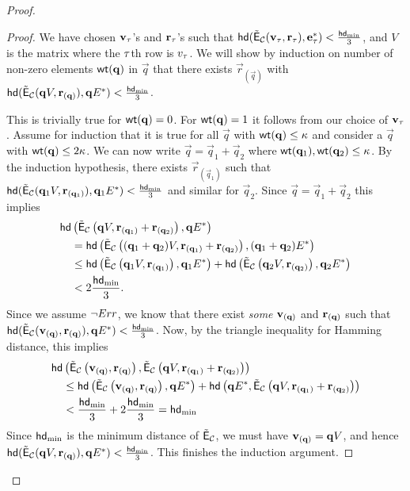 \begin{proof}
\begin{proof}
We have chosen ${\mathbf{v}}_\tau$'s and $\mathbf{r}_\tau$'s such that $\mathsf{hd}(\tilde{\mathsf{E}}_{\mathcal{C}}({\mathbf{v}}_\tau,\mathbf{r}_\tau),\mathbf{e}^*_\tau)<\frac{\mathsf{hd}_{\mathrm{min}}}{3}$, and $V$ is the matrix where the $\tau$th row is $v_\tau$. We will show by induction on number of non-zero elements $\mathsf{wt}(\mathbf{q})$ in $\vec{q}$ that there exists $\vec{r}_{(\vec{q})}$ with $\mathsf{hd}(\tilde{\mathsf{E}}_{\mathcal{C}}(\mathbf{q} V, \mathbf{r}_{(\mathbf{q})}), \mathbf{q} E^*)< \frac{\mathsf{hd}_{\mathrm{min}}}{3}$. 


This is trivially true for $\mathsf{wt}(\mathbf{q})=0$. For $\mathsf{wt}(\mathbf{q})=1$ it follows from our choice of ${\mathbf{v}}_\tau$. Assume for induction that it is true for all $\vec{q}$ with $\mathsf{wt}(\mathbf{q})\leq \kappa$ and consider a $\vec{q}$ with $\mathsf{wt}(\mathbf{q})\leq 2\kappa$.
We can now write $\vec{q}=\vec{q}_1+\vec{q}_2$ where $\mathsf{wt}(\mathbf{q}_1),\mathsf{wt}(\mathbf{q}_2)\leq \kappa$. By the induction hypothesis, there exists $\vec{r}_{(\vec{q}_1)}$ such that
$\mathsf{hd}(\tilde{\mathsf{E}}_{\mathcal{C}}(\mathbf{q}_1 V,\mathbf{r}_{(\mathbf{q}_1)}), \mathbf{q}_1 E^*)< \frac{\mathsf{hd}_{\mathrm{min}}}{3}$ and similar for $\vec{q}_2$. Since $\vec{q}=\vec{q}_1+\vec{q}_2$ this implies 
\begin{align*}
\mathsf{hd}&\left(\tilde{\mathsf{E}}_{\mathcal{C}} \left(\mathbf{q} V, \mathbf{r}_{(\mathbf{q}_1)}+\mathbf{r}_{(\mathbf{q}_2)}\right), \mathbf{q} E^*\right)\\
&= \mathsf{hd}\left(\tilde{\mathsf{E}}_{\mathcal{C}}\left((\mathbf{q}_1+\mathbf{q}_2) V, \mathbf{r}_{(\mathbf{q}_1)}+\mathbf{r}_{(\mathbf{q}_2)}\right),(\mathbf{q}_1+\mathbf{q}_2) E^*\right)\\
&\leq \mathsf{hd}\left(\tilde{\mathsf{E}}_{\mathcal{C}} \left(\mathbf{q}_1 V,\mathbf{r}_{(\mathbf{q}_1)}\right),\mathbf{q}_1 E^*\right)+\mathsf{hd}\left(\tilde{\mathsf{E}}_{\mathcal{C}} \left(\mathbf{q}_2 V, \mathbf{r}_{(\mathbf{q}_2)}\right),\mathbf{q}_2 E^*\right)\\
&< 2\frac{\mathsf{hd}_{\mathrm{min}}}{3}.
\end{align*}
Since we assume $\neg Err$, we know that there exist \emph{some} ${\mathbf{v}}_{(\mathbf{q})}$ and $\mathbf{r}_{(\mathbf{q})}$ such that $\mathsf{hd}(\tilde{\mathsf{E}}_{\mathcal{C}}({\mathbf{v}}_{(\mathbf{q})},\mathbf{r}_{(\mathbf{q})}),\mathbf{q} E^*)<\frac{\mathsf{hd}_{\mathrm{min}}}{3}$. Now, by the triangle inequality for Hamming distance, this implies
\begin{align*}
\mathsf{hd}&\left(\tilde{\mathsf{E}}_{\mathcal{C}}\left({\mathbf{v}}_{(\mathbf{q})},\mathbf{r}_{(\mathbf{q})}\right), \tilde{\mathsf{E}}_{\mathcal{C}}\left(\mathbf{q} V, \mathbf{r}_{(\mathbf{q}_1)}+\mathbf{r}_{(\mathbf{q}_2)}\right)\right)\\
&\leq \mathsf{hd}\left(\tilde{\mathsf{E}}_{\mathcal{C}}\left({\mathbf{v}}_{(\mathbf{q}) },\mathbf{r}_{(\mathbf{q})}\right),\mathbf{q} E^*\right) + \mathsf{hd}\left(\mathbf{q} E^*,\tilde{\mathsf{E}}_{\mathcal{C}}\left(\mathbf{q} V,\mathbf{r}_{(\mathbf{q}_1)}+\mathbf{r}_{(\mathbf{q}_2)}\right)\right)\\
&< \frac{\mathsf{hd}_{\mathrm{min}}}{3}+2\frac{\mathsf{hd}_{\mathrm{min}}}{3} = \mathsf{hd}_{\mathrm{min}}
\end{align*}
Since $\mathsf{hd}_{\mathrm{min}}$ is the minimum distance of $\tilde{\mathsf{E}}_{\mathcal{C}}$, we must have ${\mathbf{v}}_{(\mathbf{q})}=\mathbf{q} V$, and hence $\mathsf{hd}(\tilde{\mathsf{E}}_{\mathcal{C}}(\mathbf{q} V, \mathbf{r}_{(\mathbf{q})}), \mathbf{q} E^*)< \frac{\mathsf{hd}_{\mathrm{min}}}{3}$. This finishes the induction argument. 


\end{proof}
\end{proof}
